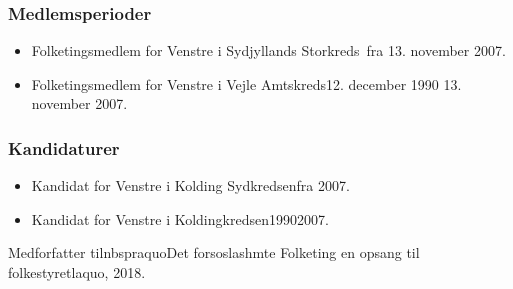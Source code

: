 \documentclass[11pt, a4paper]{awesome-cv}
\begin{document}
\begin{cvletter}
\subsubsection*{Medlemsperioder}
\begin{itemize}
\item Folketingsmedlem for Venstre i Sydjyllands Storkreds fra 13. november 2007.
\item Folketingsmedlem for Venstre i Vejle Amtskreds12. december 1990  13. november 2007.
\end{itemize}
\subsubsection*{Kandidaturer}
\begin{itemize}
\item Kandidat for Venstre i Kolding Sydkredsenfra 2007.
\item Kandidat for Venstre i Koldingkredsen19902007.
\end{itemize}
Medforfatter tilnbspraquoDet forsoslashmte Folketing  en opsang til folkestyretlaquo, 2018.

\end{cvletter}
\end{document}
